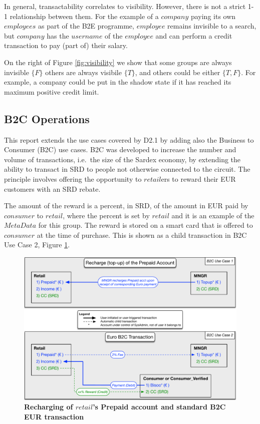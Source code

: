 In general, transactability correlates to visibility. However, there is not a strict 1-1 relationship between them. For the example of a $company$ paying its own $employees$ as part of the B2E programme, $employee$ remains invisible to a search, but $company$ has the $username$ of the $employee$ and can perform a credit transaction to pay (part of) their salary.

On the right of Figure \ref{fig:visibility} we show that some groups are always invisible $\{ F \}$ others are always visibile $\{ T \}$, and others could be either $\{T, F\}$. For example, a company could be put in the shadow state if it has reached its maximum positive credit limit.

\subsection{B2C Operations}
This report extends the use cases covered by D2.1 by adding also the Business to Consumer (B2C) use cases. B2C was developed to increase the number and volume of transactions, i.e.\ the size of the Sardex economy, by extending the ability to transact in SRD to people not otherwise connected to the circuit. The principle involves offering the opportunity to $retail$ers to reward their EUR customers with an SRD rebate.

The amount of the reward is a percent, in SRD, of the amount in EUR paid by $consumer$ to $retail$, where the percent is set by $retail$ and it is an example of the $MetaData$ for this group. The reward is stored on a smart card that is offered to $consumer$ at the time of purchase. This is shown as a child transaction in B2C Use Case 2, Figure \ref{fig:B2C1}.

\begin{figure}[htbp]
\centering
\includegraphics[width=15cm]{Figures/B2C1}
\caption{\small\textbf{Recharging of $retail$'s Prepaid account and standard B2C EUR transaction}}
\label{fig:B2C1}
\end{figure}

